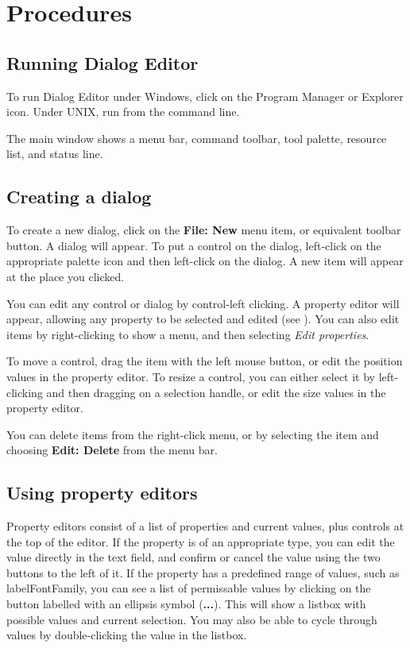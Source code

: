 \chapter{Procedures}\label{procedures}
%
\setfooter{\thepage}{}{}{}{}{\thepage}%

\section{Running Dialog Editor}

To run Dialog Editor under Windows, click on the Program Manager or Explorer icon.
Under UNIX, run from the command line.

The main window shows a menu bar, command toolbar, tool palette, resource list, and
status line.

\section{Creating a dialog}

To create a new dialog, click on the {\bf File: New} menu item, or equivalent
toolbar button. A dialog will appear. To put a control on the dialog, left-click
on the appropriate palette icon and then left-click on the dialog. A new item
will appear at the place you clicked.

You can edit any control or dialog by control-left clicking. A property editor
will appear, allowing any property to be selected and edited (see ).
You can also edit items by right-clicking to show a menu, and then selecting {\it Edit properties}.

To move a control, drag the item with the left mouse button, or edit
the position values in the property editor. To resize a control, you
can either select it by left-clicking and then dragging on a selection
handle, or edit the size values in the property editor. 

You can delete items from the right-click menu, or by selecting the item and
choosing {\bf Edit: Delete} from the menu bar.

\section{Using property editors}\label{propeditors}

Property editors consist of a list of properties and current values, plus controls at the top of
the editor. If the property is of an appropriate type, you can edit the value directly in the
text field, and confirm or cancel the value using the two buttons to the left of it.
If the property has a predefined range of values, such as labelFontFamily, you can
see a list of permissable values by clicking on the button labelled with an ellipsis symbol ({\bf ...}).
This will show a listbox with possible values and current selection. You may also be able
to cycle through values by double-clicking the value in the listbox.

